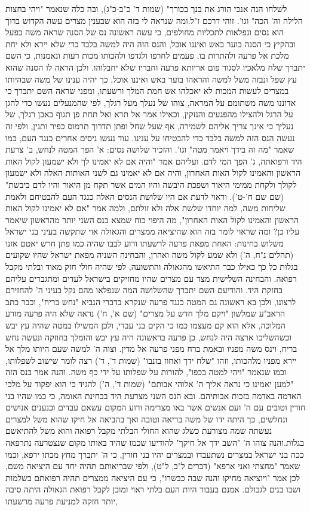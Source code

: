 \documentclass[12pt, openany]{book}
\begin{document}
לשלחו הנה אנכי הורג את בנך בכורך" (שמות ד' כ"ב-כ"ג), ובה כלה שנאמר "ויהי בחצות הלילה וה' הכה" וגו'. זוהי דרכם ז"ל.ומה שנראה לי בזה הוא שבענין מצרים עשה הקדוש ברוך הוא נסים ונפלאות לתכליות מחולפים, כי עשה ראשונה נס של הסנה שראה משה בפעל ובהקיץ כי הסנה בוער באש ואיננו אוכל, והנס הזה היה למשה בלבד כדי שלא יירא ולא יחת מלכת אל פרעה ולהתרות בו, פעמים לחרפו ולגדפו ולהכותו מכות רעות ונאמנות, כי השם יתברך שלח מלאכיו לסגור פום אריותא פרעה וחבריו שלא יחבלוהו. ולכן הראה לו הסנה שהוא עץ שפל ונבזה משל למשה והראהו בוער באש ואיננו אוכל, כך יהיה ענינו של משה שבהיותו במצרים לעשות המכות לא יאכלהו אש חמת המלך ורשעתו, ומפני שראה השם יתברך כי אדוננו משה משתומם על המראה, צוהו של נעלך מעל רגלך, לפי שהמנעלים נעשו כדי להגן על הרגל ולהצילו מהפגעים והנזקין, וכאילו אמר אל תרא ואל תחת פן תגוף באבן רגלך, של נעליך כי אינך צריך אליהם לשמירה, אף שעל שחל ופתן תדרוך תרמוס כפיר ותנין, ולפי זה נעשה הנס הזה למשה בלבד כדי להבטיחו על ענינו. עוד נעשו ניסים אחרים כנגד העם, כמו שאמר "מה זה בידך ויאמר מטה" וגו'. והזכיר שלושה נסים: א' הפך המטה לנחש, ב' צרעת היד ורפואתה, ג' הפך המי לדם. ועליהם אמר "והיה אם לא יאמינו לך ולא ישמעון לקול האות הראשון והאמינו לקול האות האחרון, והיה אם לא יאמינו גם לשני האותות האלה ולא ישמעון לקולך ולקחת ממימי היאור ושפכת היבשה והיו המים אשר תקח מן היאור והיו לדם ביבשת" (שם שם ח'-ט'). וראוי לדעת אם היו שלושת הנסים האלה כנגד העם להבטיחם ולאמת שליחות משה, למה יוחדו שלשת אלה ולא זולתם, ולמה אמר "אם לא יאמינו לקול האות הראשון והאמינו לקול האות האחרון", מה היפוי כוח שמצא בנס השני יותר מהראשון שיאמר עליו כן? ומה שראוי לומר בזה הוא שהיציאה ממצרים והגאולה אוי שתקשה בעיני בני ישראל משלוש בחינות: האחת מפאת פרעה לרשעתו ורוע לבבו שהיה כמו פתן חרש יאטם אזנו (תהלים נ"ח, ה') ולא שמע לקול משה ואהרן, והבחינה השניה מפאת ישראל שהיו שקועים בגלות כל כך כאילו כבר התיאשו מהגאולה והתשועה, לפי שהיה חולי חזק מאוד ובלתי מקבל רפואה. והבחינה השלישית מצד עם מצרים שהיו מחזיקים בישראל לעדים ומתגברים עליהם בחזקת היד. והודיעם השם יתברך  שהשלושה המה שנפלאו מהם נקל בעיני ה' להחזירם לרצונו, ולכן בא ראשונה גם המטה כנגד פרעה שנקרא בדברי הנביא "נחש בריח", וכבר כתב הראב"ע שמלשון "ויקם מלך חדש על מצרים" (שם א', ח') נראה שלא היה פרעה מזרע המלוכה, אלא הוא קם מעצמו כמו כי הקים בני עבדי, ולכן המשילו במטה שהיה עץ יבש וכשהשליכו ארצה היה לנחש, כן פרעה בראשונה היה עץ יבש והומלך בחוזקה ונעשה נחש בריח, וינס משה מפניו ובאמת ברח מפני פרעה אל מדין. וצוה ה' למשה שעם היותו מלך אל יירא מפניו מלהכותו, וזהו "שלח ידך ואחוז בזנבו" (שמות ד', ד') רצה לומר שישוב לשפלותו, וכמו שנאמר "ויהי למטה בכפו", להורות על שפלותו על ידי כף משה. והנה אמר בנס הזה "למען יאמינו כי נראה אליך ה' אלוהי אבותם" (שמות ד', ה') להגיד כי הוא יפקוד על מלכי האדמה באדמה בזכות אבותיהם. ובא הנס השני מצרעת היד בבחינת האומה, כי כמו שהיו בני חורין וטובים עם ה' ועם אנשים אשר באו מצרימה ורוע המקום עשאם עבדים וכנענים אנושים ונחלשים, כך היתה ידו של משה בריאה וטובה ואך בהביאה אל חיקו שהוא משל למצרים נעשתה שמה מצורעת כשלג שהוא החולי הבלתי מקבל רפואה והוא משל להתיאשם בגלות.והנה צוהו ה' "השב ידך אל חיקך" להודיעו שכמו שהיד באותו מקום שנצטרעה נתרפאה ככה בני ישראל במצרים נשתעבדו ובמצרים יהיו בני חורין, כי ה' יתברך מחץ מכתו ירפא, וכמו שאמר "מחצתי ואני ארפא" (דברים ל"ב, ל"ט), ולפי שבריאותם תהיה יחד עם היציאה משם, לכן אמר "ויוציאה מחיקו והנה שבה כבשרו", כי עם היציאה ממצרים תהיה רפואתם בשלמות ושבו בנים לגבולם. אמנם בעבור היות העם בלתי ראוי ומוכן לקבל רפואת הגאולה היתה סיבה יותר חזקה למניעת פרעה מרשעתו, 
\end{document}
